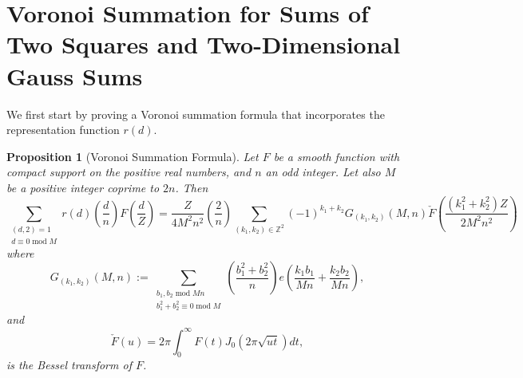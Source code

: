 \documentclass[12pt]{amsart}
\def\Z{\mathbb{Z}}
\newtheorem{proposition}[theorem]{Proposition}
\def\Z{\mathbb Z}
\def\Z{\mathbb Z}
\def\mod{\operatorname{mod}}
\begin{document}
 \section{Voronoi Summation for Sums of Two Squares and Two-Dimensional Gauss Sums}\label{sec-voronoi}
We first start by proving a Voronoi summation formula that incorporates the representation function $r(d)$.
\begin{proposition}[Voronoi Summation Formula]\label{Voronoi}
Let $F$ be a smooth function with compact support on the positive real numbers, and $n$  an odd integer. Let also $M$ be a positive integer coprime to $2n$. Then
$$ \sum_{\substack{(d,2)=1 \\ d\equiv 0 \mod M}} r(d) \left( \frac{d}{n} \right) F\left( \frac{d}{Z} \right) = \frac{Z}{4M^2n^2} \left( \frac{2}{n} \right) \sum_{(k_1,k_2)\in \Z^2} (-1)^{k_1+k_2} G_{(k_1,k_2)}(M, n) \check{F}\left( \frac{(k_1^2+k_2^2)Z}{2M^2n^2} \right) 
$$
where
    $$ G_{(k_1,k_2)}(M,n) := \sum_{\substack{b_1,b_2 \mod Mn \\ b_1^2+b_2^2\equiv 0 \mod M}} \left( \frac{b_1^2+b_2^2}{n}\right) e\left( \frac{k_1b_1}{Mn} + \frac{k_2 b_2}{Mn} \right), $$
and
\begin{equation}\label{bessel_transform_def}
\check{F} (u) = 2\pi \int_0^{\infty} F(t) J_0(2\pi \sqrt{u t}) dt ,
\end{equation}
is the Bessel transform of $F$.
\end{proposition}
\end{document}

